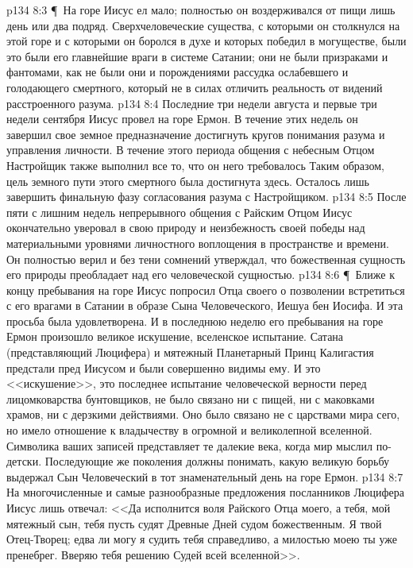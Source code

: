 \vs p134 8:3 \P\ На горе Иисус ел мало; полностью он воздерживался от пищи лишь день или два подряд. Сверхчеловеческие существа, с которыми он столкнулся на этой горе и с которыми он боролся в духе и которых победил в могуществе, были  это были его главнейшие враги в системе Сатании; они не были призраками и фантомами, как не были они и порождениями рассудка ослабевшего и голодающего смертного, который не в силах отличить реальность от видений расстроенного разума.
\vs p134 8:4 Последние три недели августа и первые три недели сентября Иисус провел на горе Ермон. В течение этих недель он завершил свое земное предназначение достигнуть кругов понимания разума и управления личности. В течение этого периода общения с небесным Отцом Настройщик также выполнил все то, что он него требовалось Таким образом, цель земного пути этого смертного была достигнута здесь. Осталось лишь завершить финальную фазу согласования разума с Настройщиком.
\vs p134 8:5 После пяти с лишним недель непрерывного общения с Райским Отцом Иисус окончательно уверовал в свою природу и неизбежность своей победы над материальными уровнями личностного воплощения в пространстве и времени. Он полностью верил и без тени сомнений утверждал, что божественная сущность его природы преобладает над его человеческой сущностью.
\vs p134 8:6 \P\ Ближе к концу пребывания на горе Иисус попросил Отца своего о позволении встретиться с его врагами в Сатании в образе Сына Человеческого, Иешуа бен Иосифа. И эта просьба была удовлетворена. И в последнюю неделю его пребывания на горе Ермон произошло великое искушение, вселенское испытание. Сатана (представляющий Люцифера) и мятежный Планетарный Принц Калигастия предстали пред Иисусом и были совершенно видимы ему. И это <<искушение>>, это последнее испытание человеческой верности перед лицомковарства бунтовщиков, не было связано ни с пищей, ни с маковками храмов, ни с дерзкими действиями. Оно было связано не с царствами мира сего, но имело отношение к владычеству в огромной и великолепной вселенной. Символика ваших записей представляет те далекие века, когда мир мыслил по\hyp{}детски. Последующие же поколения должны понимать, какую великую борьбу выдержал Сын Человеческий в тот знаменательный день на горе Ермон.
\vs p134 8:7 На многочисленные и самые разнообразные предложения посланников Люцифера Иисус лишь отвечал: <<Да исполнится воля Райского Отца моего, а тебя, мой мятежный сын, тебя пусть судят Древные Дней судом божественным. Я твой Отец\hyp{}Творец; едва ли могу я судить тебя справедливо, а милостью моею ты уже пренебрег. Вверяю тебя решению Судей всей вселенной>>.
